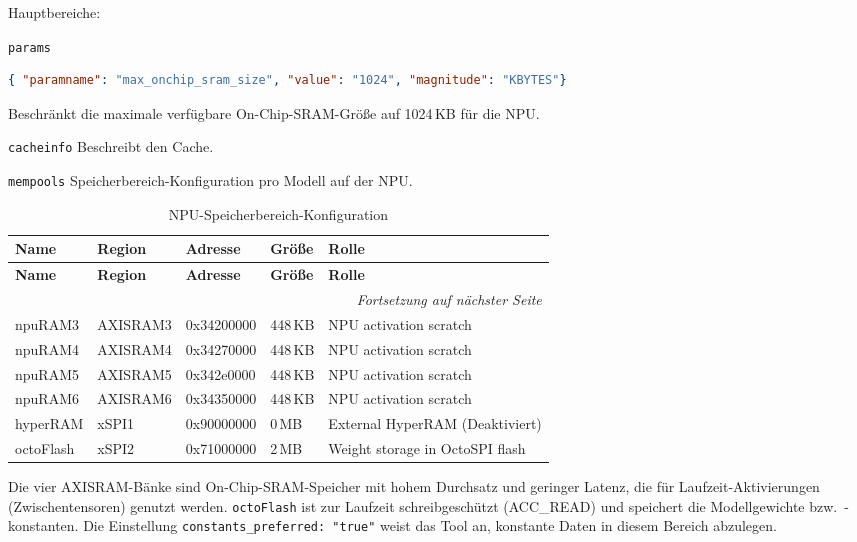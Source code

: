 Hauptbereiche:

\texttt{params}

\begin{lstlisting}[language=json, caption={Globale Speicher einschränkung in .mpool}, label={lst:mpool-params}]
{ "paramname": "max_onchip_sram_size", "value": "1024", "magnitude": "KBYTES"}
\end{lstlisting}

Beschränkt die maximale verfügbare On-Chip-SRAM-Größe auf 1024\,KB für die NPU.

\texttt{cacheinfo} Beschreibt den Cache.

\texttt{mempools} Speicherbereich-Konfiguration pro Modell auf der NPU.

\begin{longtable}{|l|l|l|l|p{}|}
    \caption{NPU-Speicherbereich-Konfiguration}
    \label{tab:npu-mempools} \\
    \hline
    \textbf{Name} & \textbf{Region} & \textbf{Adresse} & \textbf{Größe} & \textbf{Rolle} \\
    \hline
    \endfirsthead
    \hline
    \textbf{Name} & \textbf{Region} & \textbf{Adresse} & \textbf{Größe} & \textbf{Rolle} \\
    \hline
    \endhead
    \hline
    \multicolumn{5}{r}{\textit{Fortsetzung auf nächster Seite}} \\
    \endfoot
    \hline
    \endlastfoot
    npuRAM3 & AXISRAM3 & 0x34200000 & 448\,KB & NPU activation scratch \\
    \hline
    npuRAM4 & AXISRAM4 & 0x34270000 & 448\,KB & NPU activation scratch \\
    \hline
    npuRAM5 & AXISRAM5 & 0x342e0000 & 448\,KB & NPU activation scratch \\
    \hline
    npuRAM6 & AXISRAM6 & 0x34350000 & 448\,KB & NPU activation scratch \\
    \hline
    hyperRAM & xSPI1 & 0x90000000 & 0\,MB & External HyperRAM (Deaktiviert) \\
    \hline
    octoFlash & xSPI2 & 0x71000000 & 2\,MB & Weight storage in OctoSPI flash \\
    \hline
\end{longtable}

Die vier AXISRAM-Bänke sind On-Chip-SRAM-Speicher mit hohem Durchsatz und geringer Latenz, die für Laufzeit-Aktivierungen (Zwischentensoren) genutzt werden. \texttt{octoFlash} ist zur Laufzeit schreibgeschützt (ACC\_READ) und speichert die Modellgewichte bzw.\ -konstanten. Die Einstellung \texttt{constants\_preferred: "true"} weist das Tool an, konstante Daten in diesem Bereich abzulegen.

